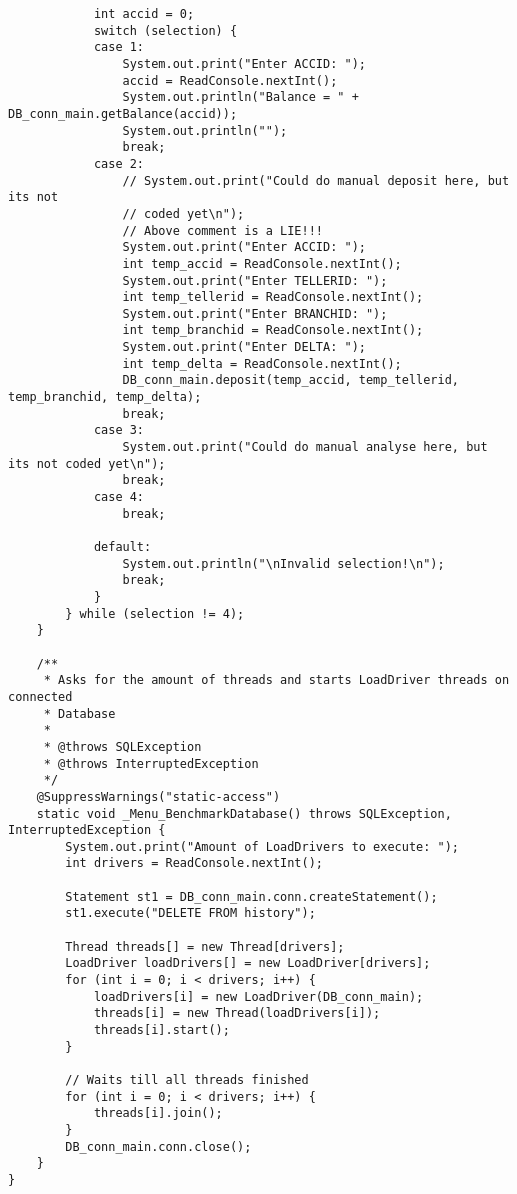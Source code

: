 \documentclass[a4paper, bibliography=totoc, 12pt]{scrartcl}
\begin{document}
\begin{lstlisting}
			int accid = 0;
			switch (selection) {
			case 1:
				System.out.print("Enter ACCID: ");
				accid = ReadConsole.nextInt();
				System.out.println("Balance = " + DB_conn_main.getBalance(accid));
				System.out.println("");
				break;
			case 2:
				// System.out.print("Could do manual deposit here, but its not
				// coded yet\n");
				// Above comment is a LIE!!!
				System.out.print("Enter ACCID: ");
				int temp_accid = ReadConsole.nextInt();
				System.out.print("Enter TELLERID: ");
				int temp_tellerid = ReadConsole.nextInt();
				System.out.print("Enter BRANCHID: ");
				int temp_branchid = ReadConsole.nextInt();
				System.out.print("Enter DELTA: ");
				int temp_delta = ReadConsole.nextInt();
				DB_conn_main.deposit(temp_accid, temp_tellerid, temp_branchid, temp_delta);
				break;
			case 3:
				System.out.print("Could do manual analyse here, but its not coded yet\n");
				break;
			case 4:
				break;

			default:
				System.out.println("\nInvalid selection!\n");
				break;
			}
		} while (selection != 4);
	}

	/**
	 * Asks for the amount of threads and starts LoadDriver threads on connected
	 * Database
	 * 
	 * @throws SQLException
	 * @throws InterruptedException
	 */
	@SuppressWarnings("static-access")
	static void _Menu_BenchmarkDatabase() throws SQLException, InterruptedException {
		System.out.print("Amount of LoadDrivers to execute: ");
		int drivers = ReadConsole.nextInt();
		
		Statement st1 = DB_conn_main.conn.createStatement();
		st1.execute("DELETE FROM history");
		
		Thread threads[] = new Thread[drivers];
		LoadDriver loadDrivers[] = new LoadDriver[drivers];
		for (int i = 0; i < drivers; i++) {
			loadDrivers[i] = new LoadDriver(DB_conn_main);
			threads[i] = new Thread(loadDrivers[i]);
			threads[i].start();
		}

		// Waits till all threads finished
		for (int i = 0; i < drivers; i++) {
			threads[i].join();
		}
		DB_conn_main.conn.close();
	}
}

\end{lstlisting}
\end{document}
